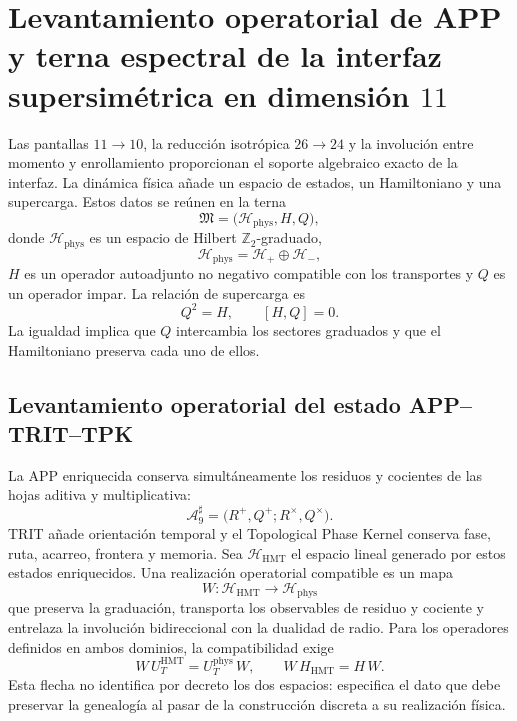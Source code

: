 \section[APP levantada y terna espectral en dimensión 11]{Levantamiento operatorial de APP y terna espectral de la interfaz supersimétrica en dimensión \texorpdfstring{\(11\)}{11}}
\label{sec:sucesor83-terna-espectral-teoria-m}

Las pantallas \(11\to10\), la reducción isotrópica \(26\to24\) y la
involución entre momento y enrollamiento proporcionan el soporte algebraico
exacto de la interfaz. La dinámica física añade un espacio de estados, un
Hamiltoniano y una supercarga. Estos datos se reúnen en la terna
\[
 \mathfrak M
 =\bigl(\mathcal H_{\mathrm{phys}},H,Q\bigr),
\]
donde \(\mathcal H_{\mathrm{phys}}\) es un espacio de Hilbert
\(\mathbb Z_2\)-graduado,
\[
 \mathcal H_{\mathrm{phys}}
 =\mathcal H_+\oplus\mathcal H_-,
\]
\(H\) es un operador autoadjunto no negativo compatible con los transportes
y \(Q\) es un operador impar. La relación de supercarga es
\begin{equation}
 Q^2=H,
 \qquad
 [H,Q]=0.
 \label{eq:sucesor83-supercarga-cuadrado-hamiltoniano}
\end{equation}
La igualdad implica que \(Q\) intercambia los sectores graduados y que el
Hamiltoniano preserva cada uno de ellos.

\subsection{Levantamiento operatorial del estado APP--TRIT--TPK}

La APP enriquecida conserva simultáneamente los residuos y cocientes de las
hojas aditiva y multiplicativa:
\[
 \mathcal A_9^\sharp
 =\bigl(R^+,Q^+;R^\times,Q^\times\bigr).
\]
TRIT añade orientación temporal y el Topological Phase Kernel conserva
fase, ruta, acarreo, frontera y memoria. Sea
\(\mathcal H_{\mathrm{HMT}}\) el espacio lineal generado por estos estados
enriquecidos. Una realización operatorial compatible es un mapa
\[
 W:\mathcal H_{\mathrm{HMT}}
 \longrightarrow\mathcal H_{\mathrm{phys}}
\]
que preserva la graduación, transporta los observables de residuo y cociente
y entrelaza la involución bidireccional con la dualidad de radio. Para los
operadores definidos en ambos dominios, la compatibilidad exige
\[
 W\,U_T^{\mathrm{HMT}}
 =U_T^{\mathrm{phys}}\,W,
 \qquad
 W\,H_{\mathrm{HMT}}
 =H\,W.
\]
Esta flecha no identifica por decreto los dos espacios: especifica el dato
que debe preservar la genealogía al pasar de la construcción discreta a su
realización física.

